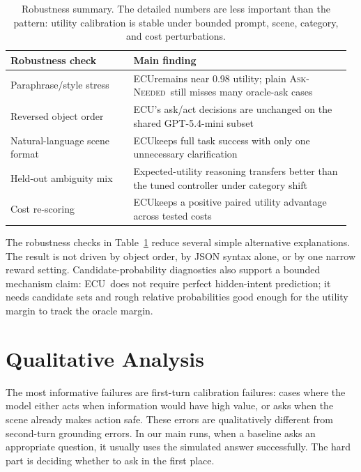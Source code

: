 \documentclass{article} %
\newcommand{\ecu}{\textsc{ECU}}
\newcommand{\askneeded}{\textsc{Ask-Needed}}
\begin{document}
\begin{table}[t]
\centering
\small
\begingroup
\renewcommand{\arraystretch}{1.5}
\begin{tabular}{@{}p{0.35\linewidth}p{0.62\linewidth}@{}}
\toprule
Robustness check & Main finding \\
\midrule
Paraphrase/style stress & \ecu remains near 0.98 utility; plain \askneeded\ still misses many oracle-ask cases \\
Reversed object order & \ecu's ask/act decisions are unchanged on the shared GPT-5.4-mini subset \\
Natural-language scene format & \ecu keeps full task success with only one unnecessary clarification \\
Held-out ambiguity mix & Expected-utility reasoning transfers better than the tuned controller under category shift \\
Cost re-scoring & \ecu keeps a positive paired utility advantage across tested costs \\
\bottomrule
\end{tabular}
\endgroup
\caption{Robustness summary. The detailed numbers are less important than the pattern: utility calibration is stable under bounded prompt, scene, category, and cost perturbations.}
\label{tab:robustness}
\end{table}

The robustness checks in Table~\ref{tab:robustness} reduce several simple alternative explanations. The result is not driven by object order, by JSON syntax alone, or by one narrow reward setting. Candidate-probability diagnostics also support a bounded mechanism claim: \ecu\ does not require perfect hidden-intent prediction; it needs candidate sets and rough relative probabilities good enough for the utility margin to track the oracle margin.

\section{Qualitative Analysis}

The most informative failures are first-turn calibration failures: cases where the model either acts when information would have high value, or asks when the scene already makes action safe. These errors are qualitatively different from second-turn grounding errors. In our main runs, when a baseline asks an appropriate question, it usually uses the simulated answer successfully. The hard part is deciding whether to ask in the first place.
\end{document}
